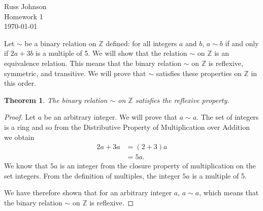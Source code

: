 \documentclass[12pt]{article}
\newtheorem{thm}{Theorem}
\begin{document}
\begin{flushright}
Russ Johnson\\
Homework 1\\
\today\\
\end{flushright}
Let $\sim$ be a binary relation on $\mathbb{Z}$ defined: for all integers $a$ and $b$, $a\sim b$ if and only if $2a+3b$ is a multiple of 5. We will show that the relation $\sim$ on $\mathbb{Z}$ is an equivalence relation. This means that the binary relation $\sim$ on $\mathbb{Z}$ is reflexive, symmetric, and transitive. We will prove that $\sim$ satisfies these properties on $\mathbb{Z}$ in this order.

\begin{thm}
The binary relation $\sim$ on $\mathbb{Z}$ satisfies the reflexive property.
\end{thm}
\begin{proof}
Let $a$ be an arbitrary integer. We will prove that $a\sim a$. The set of integers is a ring and so from the Distributive Property of Multiplication over Addition we obtain
\begin{align*}
2a+3a &= (2+3)a \\
&= 5a.
\end{align*}
We know that $5a$ is an integer from the closure property of multiplication on the set integers. From the definition of multiples, the integer $5a$ is a multiple of 5. 

We have therefore shown that for an arbitrary integer $a$, $a\sim a$, which means that the binary relation $\sim$ on $\mathbb{Z}$ is reflexive.
\end{proof}
\end{document}
